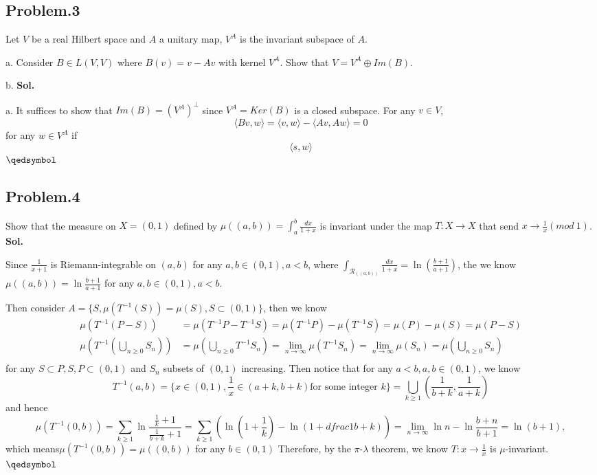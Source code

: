\documentclass[lang=en,11pt,a4paper,citestyle =authoryear]{elegantpaper}
\newcommand{\prvd}{$\hfill \qedsymbol$}
\begin{document}
\subsection*{Problem.3}
Let $V$ be a real Hilbert space and $A$ a unitary map, $V^A$ is the invariant subspace of $A$.\par
a. Consider $B\in L(V,V)$ where $B(v) = v-Av$ with kernel $V^A$. Show that $V = V^A \oplus Im(B)$.\par
b. 
\textbf{Sol.} \par
a. It suffices to show that $Im(B) = (V^A)^{\perp}$ since $V^A = Ker(B)$ is a closed subspace. For any $v\in V$,
\[\langle Bv, w\rangle = \langle v,w\rangle - \langle Av, Aw\rangle = 0\]
for any $w\in V^A$ if
\[\langle s,w \rangle\] 
\prvd
\vspace{0.5em}

\subsection*{Problem.4}
Show that the measure on $X = (0,1)$ defined by $\mu((a,b))=\int_a^b \tfrac{dx}{1+x}$ is invariant under the map $T:X\to X$ that send $x\to \tfrac{1}{x}(mod\ 1)$.
\vspace{0.5em}\\
\textbf{Sol.} \par
Since $\tfrac{1}{x+1}$ is Riemann-integrable on $(a,b)$ for any $a,b\in(0,1),a<b$, where $\int_{\mathcal{R}_((a,b))} \tfrac{dx}{1+x} = \ln (\tfrac{b+1}{a+1})$, the we know $\mu((a,b))= \ln \tfrac{b+1}{a+1}$ for any $a,b\in(0,1),a<b$.\par
Then consider $A=\{S, \mu(T^{-1}(S)) = \mu(S),S\subset (0,1)\}$, then we know
\[
\begin{aligned}
\mu(T^{-1}(P-S)) &= \mu(T^{-1}P - T^{-1}S) = \mu(T^{-1}P)-\mu(T^{-1}S) = \mu(P)-\mu(S) = \mu(P-S) \\
\mu(T^{-1}(\bigcup_{n\geq 0}S_n)) &= \mu(\bigcup_{n\geq 0}T^{-1}S_n) = \lim_{n\to\infty}\mu(T^{-1}S_n) = \lim_{n\to \infty}\mu(S_n) = \mu(\bigcup_{n\geq 0} S_n) \\
\end{aligned}
\]
for any $S\subset P, S,P\subset (0,1)$ and $S_n$ subsets of $(0,1)$ increasing. Then notice that for any $a<b,a,b\in(0,1)$, we know
\[T^{-1}(a,b) = \{x\in(0,1), \dfrac{1}{x}\in(a+k,b+k)\text{for some integer }k\} = \bigcup_{k\geq 1}(\dfrac{1}{b+k},\dfrac{1}{a+k})\]
and hence
\[\mu(T^{-1}(0,b)) = \sum\limits_{k\geq 1}\ln\dfrac{\tfrac{1}{k}+1}{\tfrac{1}{b+k}+1} = \sum\limits_{k\geq 1} (\ln(1+\dfrac{1}{k})-\ln(1+dfrac{1}{b+k})) = \lim_{n\to\infty}\ln n-\ln\dfrac{b+n}{b+1} = \ln (b+1),\]
which means$\mu(T^{-1}(0,b)) = \mu((0,b))$ for any $b\in(0,1)$ Therefore, by the $\pi$-$\lambda$ theorem, we know $T:x\to\tfrac{1}{x}$ is $\mu$-invariant.
\prvd
\vspace{0.5em}
\end{document}
